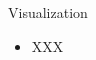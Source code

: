 

 \begin{frame}[c]{Visualization}
 \begin{itemize}
     \item XXX
 \end{itemize}
     

     
 \end{frame}


